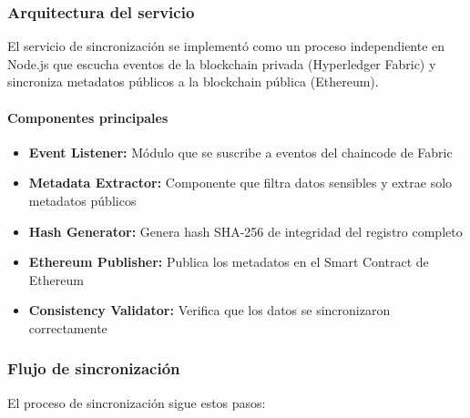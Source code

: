 \subsubsection{Arquitectura del servicio}

El servicio de sincronización se implementó como un proceso independiente en Node.js que escucha eventos de la blockchain privada (Hyperledger Fabric) y sincroniza metadatos públicos a la blockchain pública (Ethereum).

\paragraph{Componentes principales}
\begin{itemize}
    \item \textbf{Event Listener:} Módulo que se suscribe a eventos del chaincode de Fabric
    \item \textbf{Metadata Extractor:} Componente que filtra datos sensibles y extrae solo metadatos públicos
    \item \textbf{Hash Generator:} Genera hash SHA-256 de integridad del registro completo
    \item \textbf{Ethereum Publisher:} Publica los metadatos en el Smart Contract de Ethereum
    \item \textbf{Consistency Validator:} Verifica que los datos se sincronizaron correctamente
\end{itemize}

\subsubsection{Flujo de sincronización}

El proceso de sincronización sigue estos pasos:

